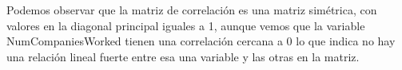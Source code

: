 Podemos observar que la matriz de correlación es una matriz simétrica, 
con valores en la diagonal principal iguales a 1, aunque vemos que la variable NumCompaniesWorked 
tienen una correlación cercana a 0 lo que indica no hay una relación lineal fuerte entre 
esa una variable y las otras en la matriz.